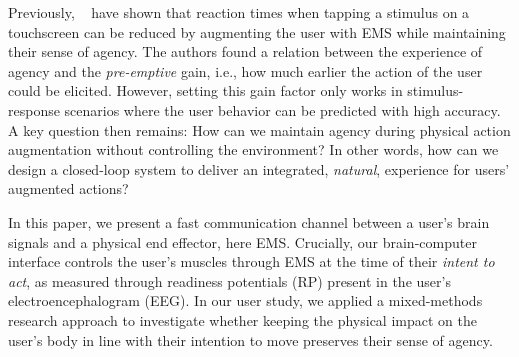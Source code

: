 Previously, ~\citet{Kasahara2019-sk} have shown that reaction times when tapping a stimulus on a touchscreen can be reduced by augmenting the user with EMS while maintaining their sense of agency. The authors found a relation between the experience of agency and the \textit{pre-emptive} gain, i.e., how much earlier the action of the user could be elicited. However, setting this gain factor only works in stimulus-response scenarios where the user behavior can be predicted with high accuracy. A key question then remains: How can we maintain agency during physical action augmentation without controlling the environment? In other words, how can we design a closed-loop system to deliver an integrated, \textit{natural}, experience for users' augmented actions?



In this paper, we present a fast communication channel between a user's brain signals and a physical end effector, here EMS. Crucially, our brain-computer interface controls the user's muscles through EMS at the time of their \textit{intent to act}, as measured through readiness potentials (RP) present in the user's electroencephalogram (EEG). In our user study, we applied a mixed-methods research approach to investigate whether keeping the physical impact on the user's body in line with their intention to move preserves their sense of agency.

